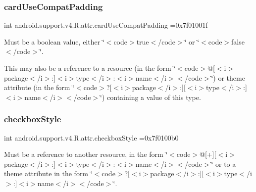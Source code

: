\subsubsection{\texorpdfstring{card\+Use\+Compat\+Padding}{cardUseCompatPadding}}
{\footnotesize\ttfamily int android.\+support.\+v4.\+R.\+attr.\+card\+Use\+Compat\+Padding =0x7f01001f\hspace{0.3cm}{\ttfamily [static]}}

Must be a boolean value, either \char`\"{}$<$code$>$true$<$/code$>$\char`\"{} or \char`\"{}$<$code$>$false$<$/code$>$\char`\"{}. 

This may also be a reference to a resource (in the form \char`\"{}$<$code$>$@\mbox{[}$<$i$>$package$<$/i$>$\+:\mbox{]}$<$i$>$type$<$/i$>$\+:$<$i$>$name$<$/i$>$$<$/code$>$\char`\"{}) or theme attribute (in the form \char`\"{}$<$code$>$?\mbox{[}$<$i$>$package$<$/i$>$\+:\mbox{]}\mbox{[}$<$i$>$type$<$/i$>$\+:\mbox{]}$<$i$>$name$<$/i$>$$<$/code$>$\char`\"{}) containing a value of this type. \mbox{\label{classandroid_1_1support_1_1v4_1_1R_1_1attr_a04c5a500ffe48ab95d64d07c4206408d}} 
\subsubsection{\texorpdfstring{checkbox\+Style}{checkboxStyle}}
{\footnotesize\ttfamily int android.\+support.\+v4.\+R.\+attr.\+checkbox\+Style =0x7f0100b0\hspace{0.3cm}{\ttfamily [static]}}

Must be a reference to another resource, in the form \char`\"{}$<$code$>$@\mbox{[}+\mbox{]}\mbox{[}$<$i$>$package$<$/i$>$\+:\mbox{]}$<$i$>$type$<$/i$>$\+:$<$i$>$name$<$/i$>$$<$/code$>$\char`\"{} or to a theme attribute in the form \char`\"{}$<$code$>$?\mbox{[}$<$i$>$package$<$/i$>$\+:\mbox{]}\mbox{[}$<$i$>$type$<$/i$>$\+:\mbox{]}$<$i$>$name$<$/i$>$$<$/code$>$\char`\"{}. \mbox{\label{classandroid_1_1support_1_1v4_1_1R_1_1attr_a1607a1060b69cce75845ca5e08c7a782}} 
